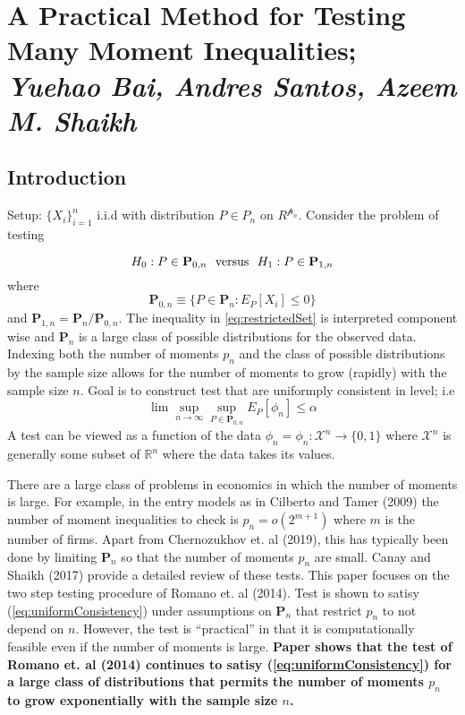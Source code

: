 
\section{A Practical Method for Testing Many Moment Inequalities; \textit{\small Yuehao Bai, Andres Santos, Azeem M. Shaikh}}

\subsection{Introduction}

Setup: $\{X_i\}_{i=1}^n$ i.i.d with distribution $P\in P_n$ on $R^{\mathscr{p}_n}$. Consider the problem of testing 

\begin{equation}
\label{eq:hypothesisTest}
	H_0: P\in \mathbf{P}_{0,n}\hbox{ }\text{ versus }\hbox{ }H_1: P\in \mathbf{P}_{1,n}
\end{equation}
where
\begin{equation}
\label{eq:restrictedSet}
	\mathbf{P}_{0,n} \equiv \{P\in \mathbf{P}_n: E_P[X_i]\leq 0\}
\end{equation}
and $\mathbf{P}_{1,n} = \mathbf{P}_n/\mathbf{P}_{0,n}$. The inequality in \ref{eq:restrictedSet} is interpreted component wise and $\mathbf{P}_n$ is a large class of possible distributions for the observed data. Indexing both the number of moments $p_n$ and the class of possible distributions by the sample size allows for the number of moments to grow (rapidly) with the sample size $n$. Goal is to construct test that are uniformply consistent in level; i.e
\begin{equation}
	\label{eq:uniformConsistency}
	\lim\sup_{n\rightarrow \infty} \sup_{P\in\mathbf{P}_{0,n}} E_P[\phi_n] \leq \alpha
\end{equation}
A test can be viewed as a function of the data $\phi_n = \phi_n: \mathscr{X}^n \rightarrow \{0,1\}$ where $\mathscr{X}^n$ is generally some subset of $\mathbb{R}^n$ where the data takes its values. 

There are a large class of problems in economics in which the number of moments is large. For example, in the entry models as in Cilberto and Tamer (2009) the number of moment inequalities to check is $p_n = o(2^{m+1})$ where $m$ is the number of firms. Apart from Chernozukhov et. al (2019), this has typically been done by limiting $\mathbf{P}_n$ so that the number of moments $p_n$ are small. Canay and Shaikh (2017) provide a detailed review of these tests. This paper focuses on the two step testing procedure of Romano et. al (2014). Test is shown to satisy (\ref{eq:uniformConsistency}) under assumptions on $\mathbf{P}_n$ that restrict $p_n$ to not depend on $n$. However, the test is ``practical'' in that it is computationally feasible even if the number of moments is large. \textbf{Paper shows that the test of Romano et. al (2014) continues to satisy (\ref{eq:uniformConsistency}) for a large class of distributions that permits the number of moments $p_n$ to grow exponentially with the sample size $n$.}

